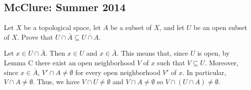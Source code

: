 \subsection{McClure: Summer 2014}
\setcounter{exercise}{0}
\begin{problem}
  Let $X$ be a topological space, let $A$ be a subset of $X$, and let $U$
  be an open subset of $X$. Prove that
  $U\cap \bar A\subseteq\overline{U\cap A}$.
\end{problem}
\begin{solution}
  Let $x\in U\cap\bar A$. Then $x\in U$ and $x\in\bar A$. This means that,
  since $U$ is open, by Lemma C there exist an open neighborhood $V$ of $x$
  such that $V\subseteq U$. Moreover, since $x\in\bar A$,
  $V'\cap A\neq\emptyset$ for every open neighborhood $V'$ of $x$. In
  particular, $V\cap A\neq\emptyset$. Thus, we have $V\cap U\neq\emptyset$
  and $V\cap A\neq\emptyset$ so $V\cap(U\cap A)\neq\emptyset$.
\end{solution}

